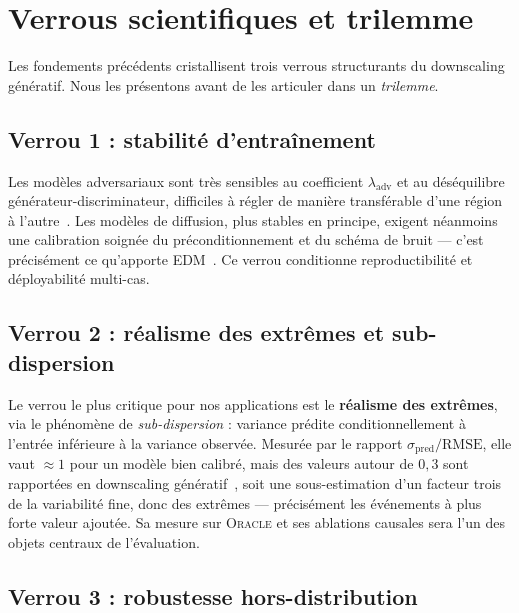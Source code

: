 \documentclass[14pt,a4paper,openany]{extreport}
\theoremstyle{definition}
\newcommand{\Oracle}{\textsc{Oracle}}
\begin{document}
\section{Verrous scientifiques et trilemme}
\label{sec:verrous}

Les fondements précédents cristallisent trois verrous structurants du downscaling génératif. Nous les présentons avant de les articuler dans un \emph{trilemme}.

\subsection{Verrou 1 : stabilité d'entraînement}
\label{ssec:verrou-stabilite}

Les modèles adversariaux sont très sensibles au coefficient $\lambda_{\mathrm{adv}}$ et au déséquilibre générateur-discriminateur, difficiles à régler de manière transférable d'une région à l'autre~\cite{rampal_cgan_2024}. Les modèles de diffusion, plus stables en principe, exigent néanmoins une calibration soignée du préconditionnement et du schéma de bruit --- c'est précisément ce qu'apporte EDM~\cite{karras_edm_2022}. Ce verrou conditionne reproductibilité et déployabilité multi-cas.

\subsection{Verrou 2 : réalisme des extrêmes et sub-dispersion}
\label{ssec:verrou-extremes}

Le verrou le plus critique pour nos applications est le \textbf{réalisme des extrêmes}, via le phénomène de \emph{sub-dispersion} : variance prédite conditionnellement à l'entrée inférieure à la variance observée. Mesurée par le rapport $\sigma_{\mathrm{pred}} / \mathrm{RMSE}$, elle vaut $\approx 1$ pour un modèle bien calibré, mais des valeurs autour de $0{,}3$ sont rapportées en downscaling génératif~\cite{rampal_cgan_2024,mardani_corrdiff_2023,harris_2022}, soit une sous-estimation d'un facteur trois de la variabilité fine, donc des extrêmes --- précisément les événements à plus forte valeur ajoutée. Sa mesure sur \Oracle{} et ses ablations causales sera l'un des objets centraux de l'évaluation.

\subsection{Verrou 3 : robustesse hors-distribution}
\label{ssec:verrou-ood}
\end{document}
